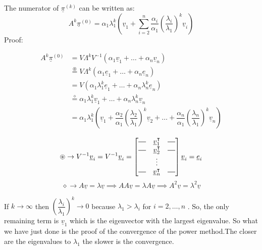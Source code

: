 The numerator of $\underline{\pi}^{(k)}$ can be written as:
\[
    A^k \underline{\pi}^{(0)} = \alpha_1\lambda_1^k \left(\underline{v}_1 + \sum_{i=2}^{n} \dfrac{\alpha_i}{\alpha_1}\left(\dfrac{\lambda_i}{\lambda_1}\right)^k \underline{v}_i\right)    
\]
Proof:
\begin{multicols}{2}
    \[
    \begin{split}
        A^k \underline{\pi}^{(0)} &= V\Lambda^k V^{-1} \left(\alpha_1\underline{v}_1 + \dots + \alpha_n\underline{v}_n\right)\\
        &\overset{\circledast }{=} V\Lambda^k \left(\alpha_1\underline{e}_1 + \dots + \alpha_n\underline{e}_n\right)\\
        &= V\left(\alpha_1\lambda_1^k\underline{e}_1 + \dots + \alpha_n\lambda_n^k\underline{e}_n \right)\\
        &\overset{\diamond}{=} \alpha_1\lambda_1^k\underline{v}_1 + \dots + \alpha_n\lambda_n^k\underline{v}_n\\
        &= \alpha_1\lambda_1^k \left(\underline{v}_1 + \dfrac{\alpha_2}{\alpha_1}\left(\dfrac{\lambda_2}{\lambda_1}\right)^k \underline{v}_2 + \dots + \dfrac{\alpha_n}{\alpha_1}\left(\dfrac{\lambda_n}{\lambda_1}\right)^k \underline{v}_n\right)\\
    \end{split}
\]
\[
    \circledast  \rightarrow V^{-1}\underline{v}_i = V^{-1}\underline{v}_i = \begin{bmatrix}
        \horzbar & \underline{v}_1^\intercal & \horzbar\\
        \horzbar & \underline{v}_2^\intercal & \horzbar\\    
         & \vdots & \\
        \horzbar & \underline{v}_n^\intercal & \horzbar
    \end{bmatrix} \underline{v}_i
    = \underline{e}_i
\]
\[
    \diamond \rightarrow A\underline{v} = \lambda\underline{v} \implies AA\underline{v} = \lambda A\underline{v} \implies A^2\underline{v} = \lambda^2\underline{v}     
\]
\end{multicols}
If $k \to \infty$ then $\left(\dfrac{\lambda_i}{\lambda_1}\right)^k \to 0$ because $\lambda_1 > \lambda_i$ for $i = 2, \dots, n$ . So, the only remaining term is $\underline{v}_1$ which is the eigenvector with the largest eigenvalue. So what we have just done is the proof of the convergence of the power method.The closer are the eigenvalues to $\lambda_1$ the slower is the convergence.

